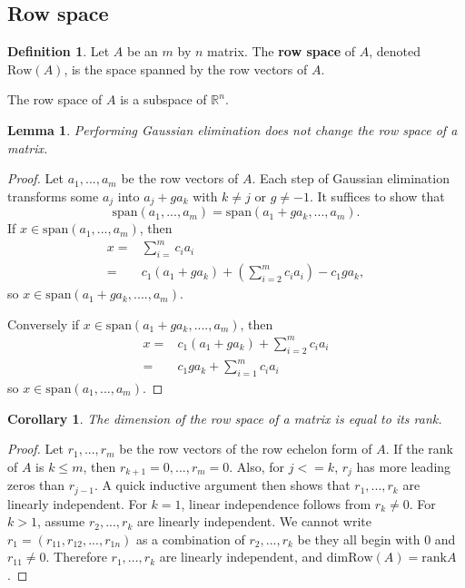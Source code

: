 \documentclass[12pt,reqno]{amsart}
\newtheorem{corollary}{Corollary}[section]
\newtheorem{lemma}{Lemma}[section]
\theoremstyle{definition}
\newtheorem{definition}{Definition}[section]
\def\R{\mathbb{R}}
\newcommand{\rank}{\mathrm{rank}}
\newcommand{\spn}{\mathrm{span}}
\newcommand{\row}{\mathrm{Row}}
\renewcommand{\dim}{\mathrm{dim}}
\begin{document}
\subsection{Row space}
\begin{definition}
  Let $A$ be an $m$ by $n$ matrix. The \textbf{row space} of $A$,
  denoted $\row (A)$, is the space spanned by the row vectors of $A$.
\end{definition}
The row space of $A$ is a subspace of $\R^n$. 
\begin{lemma}
  Performing Gaussian elimination does not change the row space of a
  matrix. 
\end{lemma}
\begin{proof}
  Let $a_{1},...,a_m$ be the row vectors of $A$. Each step of Gaussian
  elimination transforms some $a_j$ into $a_j + g a_k$ with $k \neq j$
  or $g \neq -1$. It suffices to show that
  \[ \spn(a_1,...,a_m) = \spn(a_1 + g a_k , ..., a_m). \]
  If $ x \in \spn(a_1, ..., a_m)$, then 
  \begin{align*}
    x = & \sum_{i=}^m c_i a_i  \\
    = & c_1 (a_1 + g a_k) + (\sum_{i=2}^m c_i a_i) - c_1 g a_k,
  \end{align*}
  so $x \in \spn(a_1 + g a_k, ...., a_m )$. 

  Conversely if $ x \in \spn(a_1 + g a_k, ...., a_m )$, then
  \begin{align*}
    x = & c_1 (a_1 + g a_k) + \sum_{i=2}^m c_i a_i \\
    = & c_1 g a_k + \sum_{i=1}^m c_i a_i 
  \end{align*}
  so $x \in \spn(a_1,...,a_m)$.
\end{proof}
\begin{corollary}\label{cor:rankdimrow}
  The dimension of the row space of a matrix is equal to its rank.
\end{corollary}
\begin{proof}
  Let $r_1,..., r_m$ be the row vectors of the row echelon form of
  $A$. If the rank of $A$ is $k \leq m$, then $r_{k+1}=0, ...,
  r_{m}=0$. Also, for $j <= k$, $r_j$ has more leading zeros than
  $r_{j-1}$. A quick inductive argument then shows that $r_1,...,r_k$
  are linearly independent.  For $k = 1$, linear independence follows
  from $r_k \neq 0$. For $k >1$, assume $r_2,...,r_k$ are linearly
  independent. We cannot write $r_1 = (r_{11}, r_{12},..., r_{1n})$ as
  a combination of $r_2,...,r_k$ be they all begin with 0 and $r_{11}
  \neq 0$. Therefore $r_1,...,r_k$ are linearly independent, and $\dim
  \row(A) = \rank A$.  
\end{proof}
\end{document}
